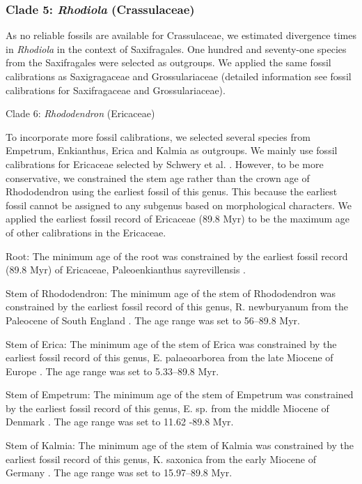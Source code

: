 \documentclass[10pt]{article}
\begin{document}
\subsubsection{Clade 5: \textit{Rhodiola} (Crassulaceae)}

As no reliable fossils are available for Crassulaceae, we estimated
divergence times in \textit{Rhodiola} in the context of
Saxifragales. One hundred and seventy-one species from the
Saxifragales were selected as outgroups. We applied the same fossil
calibrations as Saxigragaceae and Grossulariaceae (detailed
information see fossil calibrations for Saxifragaceae and
Grossulariaceae).

Clade 6: \textit{Rhododendron} (Ericaceae)

To incorporate more fossil calibrations, we selected several species
from Empetrum, Enkianthus, Erica and Kalmia as outgroups.  We mainly
use fossil calibrations for Ericaceae selected by Schwery et
al. \citep{Schwery2015}. However, to be more conservative, we
constrained the stem age rather than the crown age of Rhododendron
using the earliest fossil of this genus. This because the earliest
fossil cannot be assigned to any subgenus based on morphological
characters. We applied the earliest fossil record of Ericaceae (89.8
Myr) to be the maximum age of other calibrations in the Ericaceae.

Root: The minimum age of the root was constrained by the earliest
fossil record (89.8 Myr) of Ericaceae, Paleoenkianthus sayrevillensis
\citep{Nixon1993}.

Stem of Rhododendron: The minimum age of the stem of Rhododendron was
constrained by the earliest fossil record of this genus,
R. newburyanum from the Paleocene of South England
\citep{Collinson1978}. The age range was set to 56--89.8 Myr.

Stem of Erica: The minimum age of the stem of Erica was constrained by
the earliest fossil record of this genus, E. palaeoarborea from the
late Miocene of Europe \citep{VanderBurgh1987}. The age range was set
to 5.33--89.8 Myr.

Stem of Empetrum: The minimum age of the stem of Empetrum was
constrained by the earliest fossil record of this genus, E. sp. from
the middle Miocene of Denmark \citep{Friis1979}. The age range was set
to 11.62 -89.8 Myr.

Stem of Kalmia: The minimum age of the stem of Kalmia was constrained
by the earliest fossil record of this genus, K. saxonica from the
early Miocene of Germany \citep{VanderBurgh1987}. The age range was
set to 15.97--89.8 Myr.
\end{document}
